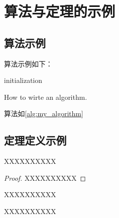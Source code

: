 %
% 
%


\chapter{算法与定理的示例}\label{ch:5}

\section{算法示例}

\noindent 算法示例如下：

\begin{algorithm}[H]
    initialization\;
    \caption{How to wirte an algorithm.}
    \label{alg:my_algorithm}
\end{algorithm}

算法如\cref{alg:my_algorithm}

\section{定理定义示例}

\begin{theorem}
    XXXXXXXXXX
\end{theorem}
\begin{proof}
    XXXXXXXXXX
\end{proof}
\begin{corollary}
    XXXXXXXXXX
\end{corollary}
\begin{lemma}
    XXXXXXXXXX
\end{lemma}